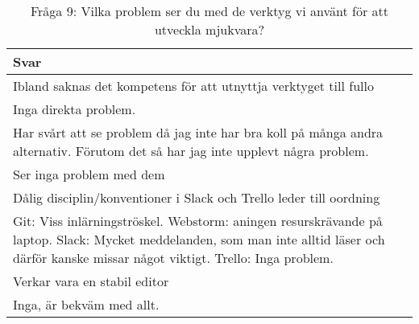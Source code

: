 \begin{table}[h!]
\centering
  \caption{Fråga 9: Vilka problem ser du med de verktyg vi använt för att utveckla mjukvara?}
  \def\arraystretch{1.5}
  \begin{adjustbox}{max width=\textwidth}
    \begin{tabularx}{\textwidth}{| X |}
      \hline
      \textbf{Svar} \\
      \hline
      Ibland saknas det kompetens för att utnyttja verktyget till fullo \\
      \hline
      Inga direkta problem. \\
      \hline
      Har svårt att se problem då jag inte har bra koll på många andra alternativ. Förutom det så har jag inte upplevt några problem.\\
      \hline 
      Ser inga problem med dem\\
      \hline 
      Dålig disciplin/konventioner i Slack och Trello leder till oordning \\
      \hline 
      Git: Viss inlärningströskel. Webstorm: aningen resurskrävande på laptop. Slack: Mycket meddelanden, som man inte alltid läser och därför kanske missar något viktigt. Trello: Inga problem.\\
      \hline 
      Verkar vara en stabil editor\\
      \hline  
      Inga, är bekväm med allt.\\
      \hline
    \end{tabularx}
  \end{adjustbox}
\end{table}

